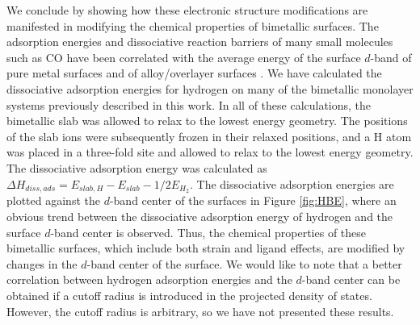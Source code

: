 \documentclass[aps,prl,twocolumn,superscriptaddress,showkeys]{revtex4}
\begin{document}
We conclude by showing how these electronic structure modifications
are manifested in modifying the chemical properties of bimetallic
surfaces. The adsorption energies and dissociative reaction barriers
of many small molecules such as CO have been correlated with the
average energy of the surface $d$-band of pure metal surfaces
\cite{norskov2002:_univer} and of alloy/overlayer surfaces
\cite{hammer1996:_co}. We have calculated the dissociative adsorption
energies for hydrogen on many of the bimetallic monolayer systems
previously described in this work. In all of these calculations, the
bimetallic slab was allowed to relax to the lowest energy geometry.
The positions of the slab ions were subsequently frozen in their
relaxed positions, and a H atom was placed in a three-fold site and
allowed to relax to the lowest energy geometry. The dissociative
adsorption energy was calculated as $\Delta
H_{diss,ads}=E_{slab,H}-E_{slab}-1/2E_{H_2}$.  The dissociative
adsorption energies are plotted against the $d$-band center of the
surfaces in Figure \ref{fig:HBE}, where an obvious trend between the
dissociative adsorption energy of hydrogen and the surface $d$-band
center is observed. Thus, the chemical properties of these bimetallic
surfaces, which include both strain and ligand effects, are modified
by changes in the $d$-band center of the surface. We would like to note
that a better correlation between hydrogen adsorption energies and the
$d$-band center can be obtained if a cutoff radius is introduced in the
projected density of states. However, the cutoff radius is arbitrary,
so we have not presented these results.
\end{document}
